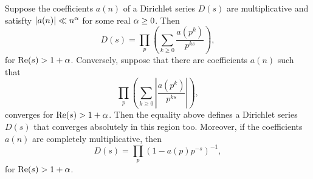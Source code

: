      \begin{proposition}\label{prop:Dirichlet_series_Euler_product}
          Suppose the coefficients $a(n)$ of a Dirichlet series $D(s)$ are multiplicative and satisfty $|a(n)| \ll n^{\alpha}$ for some real $\alpha \ge 0$. Then
          \[
            D(s) = \prod_{p}\left(\sum_{k \ge 0}\frac{a(p^{k})}{p^{ks}}\right),
          \]
          for $\mathrm{Re}(s) > 1+\alpha$. Conversely, suppose that there are coefficients $a(n)$ such that
          \[
            \prod_{p}\left(\sum_{k \ge 0}\left|\frac{a(p^{k})}{p^{ks}}\right|\right),
          \]
          converges for $\mathrm{Re}(s) > 1+\alpha$. Then the equality above defines a Dirichlet series $D(s)$ that converges absolutely in this region too. Moreover, if the coefficients $a(n)$ are completely multiplicative, then
          \[
            D(s) = \prod_{p}(1-a(p)p^{-s})^{-1},
          \]
          for $\mathrm{Re}(s) > 1+\alpha$.
      \end{proposition}
